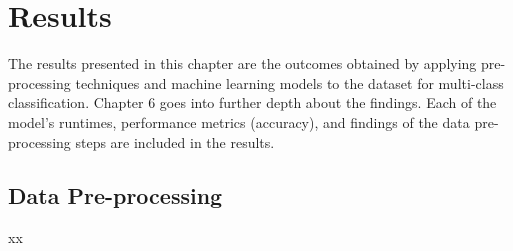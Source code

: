 \chapter{Results}

The results presented in this chapter are the outcomes obtained by applying pre-processing techniques and machine learning models to the dataset for multi-class classification. Chapter 6 goes into further depth about the findings. Each of the model’s runtimes, performance metrics (accuracy), and findings of the data pre-processing steps are included in the results. 

\section{Data Pre-processing}

xx